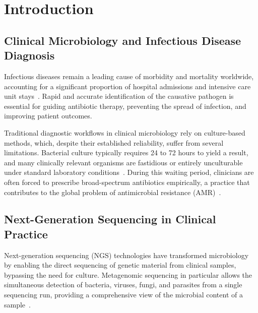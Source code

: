 %

\chapter{Introduction}

\section{Clinical Microbiology and Infectious Disease Diagnosis}

Infectious diseases remain a leading cause of morbidity and mortality worldwide,
accounting for a significant proportion of hospital admissions and intensive care
unit stays~\cite{TODO_WHO_infectious_disease}. Rapid and accurate identification
of the causative pathogen is essential for guiding antibiotic therapy, preventing
the spread of infection, and improving patient outcomes.

Traditional diagnostic workflows in clinical microbiology rely on culture-based
methods, which, despite their established reliability, suffer from several
limitations. Bacterial culture typically requires 24 to 72 hours to yield a
result, and many clinically relevant organisms are fastidious or entirely
unculturable under standard laboratory conditions~\cite{TODO_culture_limitations}.
During this waiting period, clinicians are often forced to prescribe broad-spectrum
antibiotics empirically, a practice that contributes to the global problem of
antimicrobial resistance (AMR)~\cite{TODO_AMR_global}.

\section{Next-Generation Sequencing in Clinical Practice}

Next-generation sequencing (NGS) technologies have transformed microbiology by
enabling the direct sequencing of genetic material from clinical samples, bypassing
the need for culture. Metagenomic sequencing in particular allows the simultaneous
detection of bacteria, viruses, fungi, and parasites from a single sequencing run,
providing a comprehensive view of the microbial content of a sample~\cite{TODO_metagenomics_review}.

